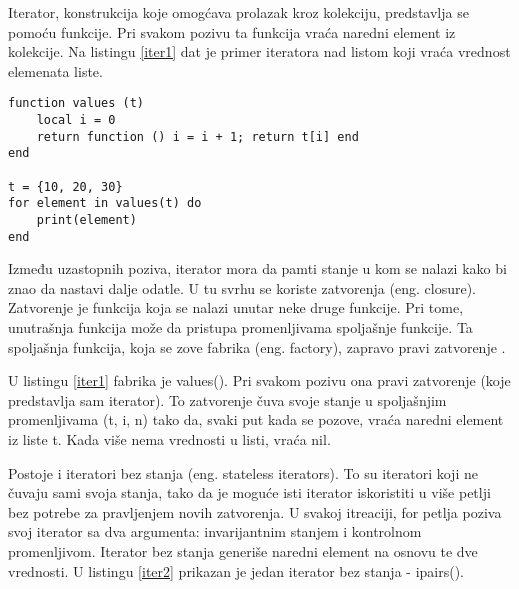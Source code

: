 \documentclass[a4paper]{article}
\begin{document}
Iterator, konstrukcija koje omogćava prolazak kroz kolekciju, predstavlja se pomoću funkcije. Pri svakom pozivu ta funkcija vraća naredni element iz kolekcije. Na listingu \ref{iter1} dat je primer iteratora nad listom koji vraća vrednost elemenata liste.

\begin{lstlisting}[caption={Primer iteratora nad listom},frame=single, label=iter1]
function values (t)
	local i = 0
	return function () i = i + 1; return t[i] end
end

t = {10, 20, 30}
for element in values(t) do
	print(element)
end
\end{lstlisting}

Između uzastopnih poziva, iterator mora da pamti stanje u kom se nalazi kako bi znao da nastavi dalje odatle. U tu svrhu se koriste zatvorenja (eng. closure). Zatvorenje je funkcija koja se nalazi unutar neke druge funkcije. Pri tome, unutrašnja funkcija može da pristupa promenljivama spoljašnje funkcije. Ta spoljašnja funkcija, koja se zove fabrika (eng. factory), zapravo pravi zatvorenje \cite{lua_org_iterators}.

U listingu \ref{iter1} fabrika je values(). Pri svakom pozivu ona pravi zatvorenje (koje predstavlja sam iterator). To zatvorenje čuva svoje stanje u spoljašnjim promenljivama (t, i, n) tako da, svaki put kada se pozove, vraća naredni element iz liste t. Kada više nema vrednosti u listi, vraća nil.

Postoje i iteratori bez stanja (eng. stateless iterators). To su iteratori koji ne čuvaju sami svoja stanja, tako da je moguće isti iterator iskoristiti u više petlji bez potrebe za pravljenjem novih zatvorenja. U svakoj itreaciji, for petlja poziva svoj iterator sa dva argumenta: invarijantnim stanjem i kontrolnom promenljivom. Iterator bez stanja generiše naredni element na osnovu te dve vrednosti. U listingu \ref{iter2} prikazan je jedan iterator bez stanja - ipairs()\cite{bookProgInLua}.
\end{document}
